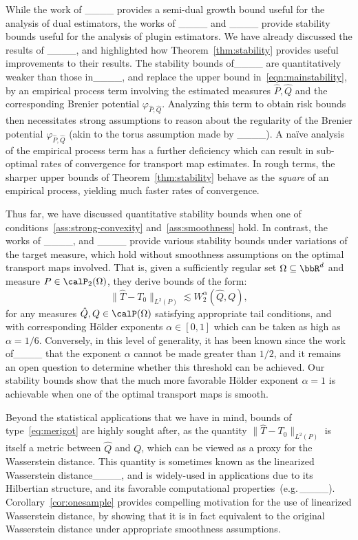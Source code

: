 While the work of ____ provides a semi-dual growth bound useful for the analysis of dual estimators, the works of ____ and ____ provide stability bounds useful for the analysis of plugin estimators. We have already discussed the results of ____, and highlighted how Theorem~\ref{thm:stability} provides useful improvements to their results. The stability bounds of____ are quantitatively weaker than those in____, and replace the upper bound in~\eqref{eqn:mainstability}, by an empirical process term involving the estimated measures $\widehat{P}, \widehat{Q}$ and the corresponding Brenier potential $\varphi_{\widehat{P},\widehat{Q}}$. Analyzing this term to obtain risk bounds then necessitates strong assumptions to reason about the regularity of the Brenier potential $\varphi_{\widehat{P},\widehat{Q}}$ (akin to the torus assumption made by ____). 
A na\"{i}ve analysis of the empirical process term has a further deficiency which can result in sub-optimal rates of convergence for transport map estimates. In rough terms, the sharper upper bounds of Theorem~\ref{thm:stability} behave as the \emph{square} of an empirical process, yielding much faster rates of convergence.

Thus far, we have discussed
quantitative stability bounds
when one of conditions~\ref{ass:strong-convexity}
and~\ref{ass:smoothness} hold. 
In contrast, the works of ____, and ____  provide various stability bounds under variations of the target measure, which hold without smoothness assumptions on the optimal transport maps involved. That is, 
given a sufficiently regular
set $\Omega \subseteq \bbR^d$
and measure $P \in \calP_2(\Omega)$,
they derive bounds of the form:
\begin{equation}
\label{eq:merigot}
\|\hat T - T_0\|_{L^2(P)} \lesssim  W_2^\alpha(\hat Q,Q),
\end{equation}
for any measures $\hat Q,Q \in \calP(\Omega)$
satisfying appropriate tail conditions,
and with corresponding H\"older exponents $\alpha\in[0,1]$
which can be taken as high as $\alpha=1/6$.
Conversely, in this level
of generality, it
has been known since the work
of____
that the exponent $\alpha$ cannot be made greater than $1/2$, 
and it remains an open question to determine
whether this threshold can be achieved.
Our stability bounds show that 
the much more favorable H\"older exponent $\alpha=1$
is achievable when one of the optimal
transport maps is smooth. 

Beyond the statistical applications
that we have in mind, 
bounds of type~\eqref{eq:merigot} are highly sought after, as
the quantity $\|\hat T-T_0\|_{L^2(P)}$
is itself a metric between
$\hat Q$ and $Q$, which can be viewed as a proxy
for the Wasserstein distance. 
This quantity is sometimes
known as the linearized Wasserstein distance____,
and is widely-used in applications
due to its Hilbertian structure, and  its favorable computational properties~(e.g.\,____). 
Corollary~\ref{cor:onesample} provides 
compelling motivation for the use of 
linearized Wasserstein distance, by showing
that it is in fact equivalent to the
original Wasserstein distance
under appropriate smoothness assumptions.